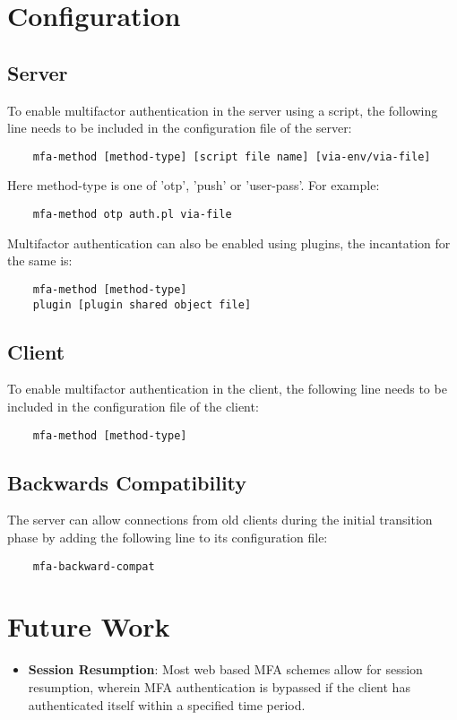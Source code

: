 \documentclass[11pt,oneside]{book}
\begin{document}
\section{Configuration}
\subsection{Server}
To enable multifactor authentication in the server using a script, the following line needs to be
included in the configuration file of the server:

\begin{verbatim}
    mfa-method [method-type] [script file name] [via-env/via-file]
\end{verbatim}

\noindent Here method-type is one of 'otp', 'push' or 'user-pass'. For example:
\begin{verbatim}
    mfa-method otp auth.pl via-file
\end{verbatim}

\noindent Multifactor authentication can also be enabled using plugins, the incantation for the same is:
\begin{verbatim}
    mfa-method [method-type]
    plugin [plugin shared object file]
\end{verbatim}

\subsection{Client}
To enable multifactor authentication in the client, the following line needs to be included in the
configuration file of the client:

\begin{verbatim}
    mfa-method [method-type]
\end{verbatim}

\subsection{Backwards Compatibility}
\label{MFA:BackwardCompat}
The server can allow connections from old clients during the initial transition phase by adding
the following line to its configuration file:

\begin{verbatim}
    mfa-backward-compat
\end{verbatim}

\section{Future Work}
\begin{itemize}
    \item \textbf{Session Resumption}: Most web based MFA schemes allow for session resumption,
        wherein MFA authentication is bypassed if the client has authenticated itself within
        a specified time period.
\end{itemize}
\end{document}
